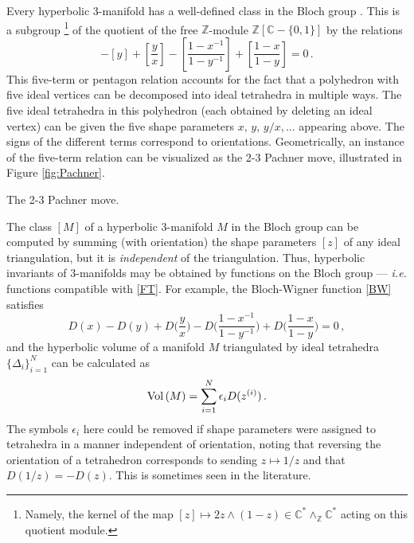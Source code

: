 \documentclass[hyper]{JHEP3}
\newcommand{\C}{{\mathbb{C}}}
\newcommand{\Z}{{\mathbb{Z}}}
\newcommand\be{\begin{equation}}
\newcommand\ee{\end{equation}}
\newcommand{\Vol}{{\mbox{Vol\,}}}
\begin{document}
Every hyperbolic 3-manifold has a well-defined class in the Bloch group \cite{neumann-1997}. This is a subgroup%
%
\footnote{Namely, the kernel of the map $[z]\mapsto 2z\wedge(1-z) \in \C^*\wedge_\Z \C^*$ acting on this quotient module.} %
%
of the quotient of the free $\Z$-module $\Z[\C-\{0,1\}]$ by the relations%
\be
[x]-[y]+[\frac{y}{x}]-[\frac{1-x^{-1}}{1-y^{-1}}]+[\frac{1-x}{1-y}]=0\,. \label{FT}
\ee
%
This five-term or pentagon relation accounts for the fact that a polyhedron with five ideal vertices can be decomposed into ideal tetrahedra in multiple ways. The five ideal tetrahedra in this polyhedron (each obtained by deleting an ideal vertex) can be given the five shape parameters $x,\,y,\,y/x,...$ appearing above. The signs of the different terms correspond to orientations. Geometrically, an instance of the five-term relation can be visualized as the 2-3 Pachner move, illustrated in Figure \ref{fig:Pachner}.

%
{The 2-3 Pachner move.
\label{fig:Pachner} }

The class $[M]$ of a hyperbolic 3-manifold $M$ in the Bloch group can be computed by summing (with orientation) the shape parameters $[z]$ of any ideal triangulation, but it is {\it independent} of the triangulation. Thus, hyperbolic invariants of 3-manifolds may be obtained by functions on the Bloch group --- {\it i.e.} functions compatible with \eqref{FT}. For example, the Bloch-Wigner function \eqref{BW} satisfies
%
\be D(x)-D(y)+D\big(\frac{y}{x}\big)-D\big(\frac{1-x^{-1}}{1-y^{-1}}\big)+D\big(\frac{1-x}{1-y}\big)=0\,, \ee
%
and the hyperbolic volume of a manifold $M$ triangulated by ideal tetrahedra $\{\Delta_i\}_{i=1}^{N}$ can be calculated as
%
\be \Vol(M) = \sum_{i=1}^{N}\epsilon_i D(z^{(i)})\,. \label{VolM} \ee
%
The symbols $\epsilon_i$ here could be removed if shape parameters were assigned to tetrahedra in a manner independent of orientation, noting that reversing the orientation of a tetrahedron corresponds to sending $z\mapsto 1/z$ and that $D(1/z)=-D(z)$. This is sometimes seen in the literature.
\end{document}
